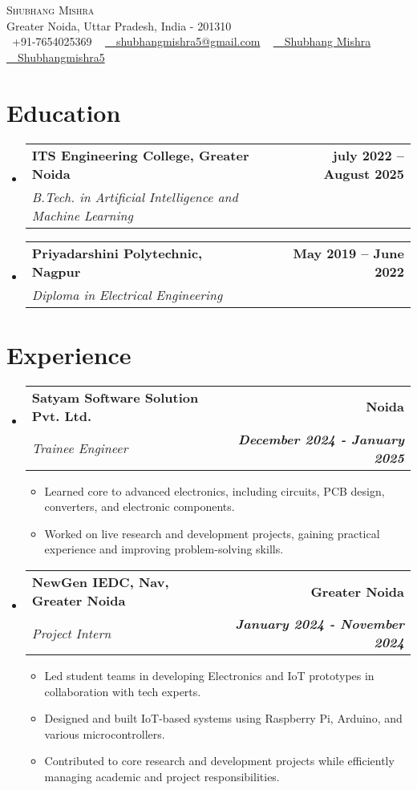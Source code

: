 \documentclass[letterpaper,11pt]{article}
\makeatletter
\newcommand{\resumeItem}[1]{
  \item\small{
    {#1 \vspace{-2pt}}
  }
}
\newcommand{\resumeSubheading}[4]{
  \vspace{-2pt}\item
    \begin{tabular*}{1.0\textwidth}[t]{l@{\extracolsep{\fill}}r}
      \textbf{#1} & \textbf{\small #2} \\
      \textit{\small#3} & \textit{\small #4} \\
    \end{tabular*}\vspace{-7pt}
}
\newcommand{\resumeSubHeadingListStart}{\begin{itemize}[leftmargin=0.0in, label={}]}
\newcommand{\resumeSubHeadingListEnd}{\end{itemize}}
\newcommand{\resumeItemListStart}{\begin{itemize}}
\newcommand{\resumeItemListEnd}{\end{itemize}\vspace{-5pt}}
\makeatother
\begin{document}
\begin{center}
    {\Huge \scshape Shubhang Mishra} \\ \vspace{0.5pt}
    Greater Noida, Uttar Pradesh, India - 201310 \\ \vspace{0.5pt}
    \small \raisebox{-0.0\height}\faPhone\ +91-7654025369 ~ \href{mailto:shubhangmishra5@gmail.com}{\raisebox{-0.0\height}\faEnvelope\  \ shubhangmishra5@gmail.com} ~ \href{https://www.linkedin.com/in/shubhang-mishra-b7b1181b2/
}{\raisebox{-0.0\height}\faLinkedin\ \ Shubhang Mishra}  ~
    \href{https://github.com/Shubhangmishra5}{\raisebox{-0.0\height}\faGithub\ \ Shubhangmishra5}
    \vspace{-8pt}
\end{center}


\section{Education}
  \resumeSubHeadingListStart
    \resumeSubheading
      {ITS Engineering College, Greater Noida}{july 2022 -- August 2025}
      {B.Tech. in Artificial Intelligence and Machine Learning}{}
     
    \resumeSubheading
      {Priyadarshini Polytechnic, Nagpur}{May 2019 -- June 2022}
      {Diploma in Electrical Engineering}{}  
  \resumeSubHeadingListEnd


\section{Experience}
  \resumeSubHeadingListStart

    \resumeSubheading      
      {Satyam Software Solution Pvt. Ltd.}{Noida}
      {Trainee Engineer }{\textbf{December 2024 - January 2025}}
      \resumeItemListStart
        \resumeItem{Learned core to advanced electronics, including circuits, PCB design, converters, and electronic components.}
        \resumeItem{Worked on live research and development projects, gaining practical experience and improving problem-solving skills.}
      \resumeItemListEnd
    
    
    \resumeSubheading      
      {NewGen IEDC, Nav, Greater Noida}{Greater Noida}
      {Project Intern}{\textbf{January 2024 - November 2024}}
      \resumeItemListStart
        \resumeItem{Led student teams in developing  Electronics and IoT prototypes in collaboration with tech experts.}
        \resumeItem{Designed and built IoT-based systems using Raspberry Pi, Arduino, and various microcontrollers.}
        \resumeItem{Contributed to core research and development projects while efficiently managing academic and project responsibilities.

}
      \resumeItemListEnd
\resumeSubHeadingListEnd
\end{document}
